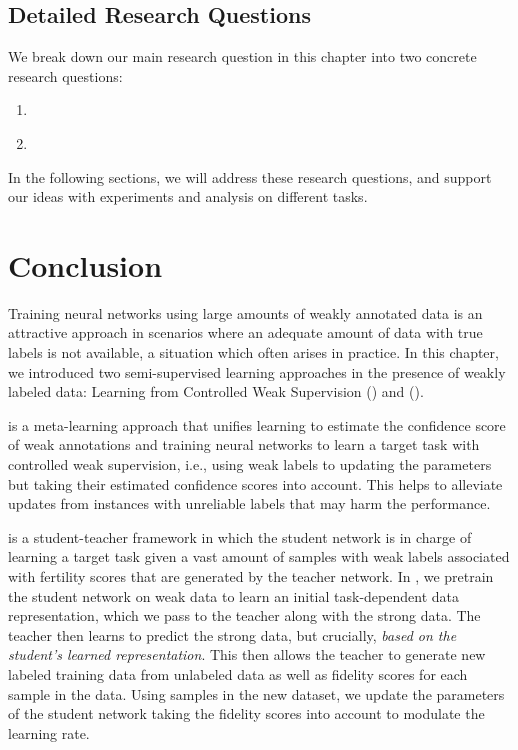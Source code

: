 \subsection{Detailed Research Questions}
We break down our main research question in this chapter into two concrete research questions:
\begin{resqbox}
\begin{enumerate}
\item[\textbf{\resqname{c5.1}}] \emph{}
\item[\textbf{\resqname{c5.2}}] \emph{}
\end{enumerate}
\end{resqbox}
In the following sections, we will address these research questions, and support our ideas with experiments and analysis on different tasks.







\section{Conclusion}
Training neural networks using large amounts of weakly annotated data is an attractive approach in scenarios where an adequate amount of data with true labels is not available, a situation which often arises in practice.
%
In this chapter, we introduced two semi-supervised learning approaches in the presence of weakly labeled data: Learning from Controlled Weak Supervision (\cws) and \fwlfulllc (\fwl).

\cws is a meta-learning approach that unifies learning to estimate the confidence score of weak annotations and training neural networks to learn a target task with controlled weak supervision, i.e., using weak labels to updating the parameters but taking their estimated confidence scores into account. This helps to alleviate updates from instances with unreliable labels that may harm the performance.

\fwl is a student-teacher framework in which the student network is in charge of learning a target task given a vast amount of samples with weak labels associated with fertility scores that are generated by the teacher network. In \fwl, we pretrain the student network on weak data to learn an initial task-dependent data representation, which we pass to the teacher along with the strong data. The teacher then learns to predict the strong data, but crucially, \emph{based on the student's learned representation}. This then allows the teacher to generate new labeled training data from unlabeled data as well as fidelity scores for each sample in the data. Using samples in the new dataset, we update the parameters of the student network taking the fidelity scores into account to modulate the learning rate. 


